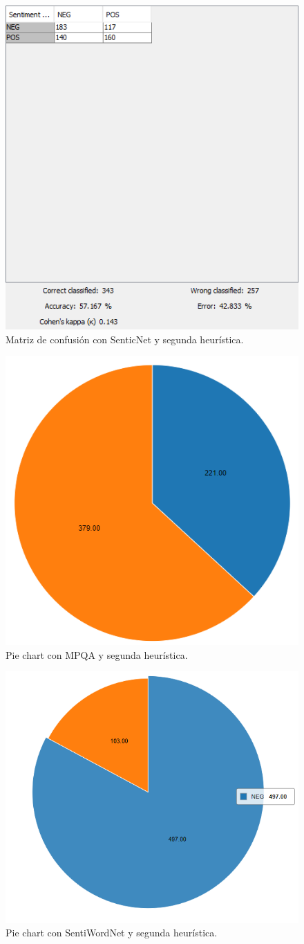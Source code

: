 \begin{figure}[H]
    \center\includegraphics[width=.95\linewidth]{img/analysis/score3-2.png}
    \caption{Matriz de confusión con SenticNet y segunda heurística.}
\end{figure}

\newpage

\begin{figure}[H]
    \center\includegraphics[height=.4\linewidth]{img/analysis/pie1-2.png}
    \caption{Pie chart con MPQA y segunda heurística.}
\end{figure}

\begin{figure}[H]
    \center\includegraphics[height=.4\linewidth]{img/analysis/pie2-2.png}
    \caption{Pie chart con SentiWordNet y segunda heurística.}
\end{figure}

